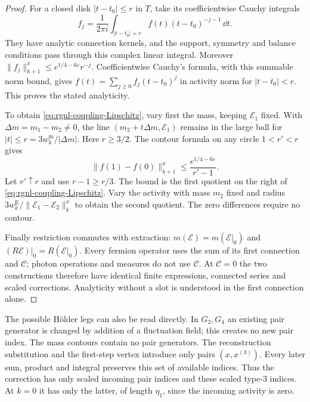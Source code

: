 \begin{proof}
For a closed disk $|t-t_0|\le r$ in $T$, take its
coefficientwise Cauchy integrals
\[
 f_j=\frac1{2\pi i}\int_{|t-t_0|=r}
                             f(t)(t-t_0)^{-j-1}\,\dd t.
\]
They have analytic connection kernels, and the support,
symmetry and balance conditions pass through this
complex linear integral. Moreover
$\|f_j\|_{k+1}^x\le e^{1/4-6\varepsilon}r^{-j}$.
Coefficientwise Cauchy's formula, with this summable
norm bound, gives
$f(t)=\sum_{j\ge0}f_j(t-t_0)^j$ in activity norm for
$|t-t_0|<r$. This proves the stated analyticity.

To obtain \eqref{eq:rgnl-coupling-Lipschitz}, vary first
the mass, keeping $\mathscr E_1$ fixed. With
$\Delta m=m_1-m_2\ne0$, the line
$(m_2+t\Delta m,\mathscr E_1)$ remains in the large
ball for $|t|\le r=3w_k^{\mathrm m}/|\Delta m|$.
Here $r\ge3/2$. The contour formula on any circle
$1<r'<r$ gives
\[
 \|f(1)-f(0)\|_{k+1}^x
        \le\frac{e^{1/4-6\varepsilon}}{r'-1}.
\]
Let $r'\uparrow r$ and use $r-1\ge r/3$.
The bound is the first quotient on the right of
\eqref{eq:rgnl-coupling-Lipschitz}.
Vary the activity with mass $m_2$ fixed and radius
$3w_k^{\mathrm E}/\|\mathscr E_1-\mathscr E_2\|_k^x$
to obtain the second quotient.
The zero differences require no contour.

Finally restriction commutes with extraction:
$m(\mathscr E)=m(\mathscr E|_0)$ and
$(R\mathscr E)|_0=R(\mathscr E|_0)$.
Every fermion operator uses the sum of its first
connection and $\mathscr C$; photon operations and
measures do not use $\mathscr C$.
At $\mathscr C=0$ the two constructions therefore have
identical finite expressions, connected series and
scaled corrections. Analyticity without a slot is
understood in the first connection alone.
\end{proof}

The possible H\"older legs can also be read directly.
In $G_2,G_4$ an existing pair generator is changed by
addition of a fluctuation field; this creates no new
pair index. The mass contours contain no pair
generators. The reconstruction substitution and the
first-step vertex introduce only pairs $(x,x^{(3)})$.
Every later sum, product and integral preserves this
set of available indices. Thus the correction has
only scaled incoming pair indices and these scaled
type-$3$ indices. At $k=0$ it has only the latter,
of length $\eta_1$, since the incoming activity is zero.

